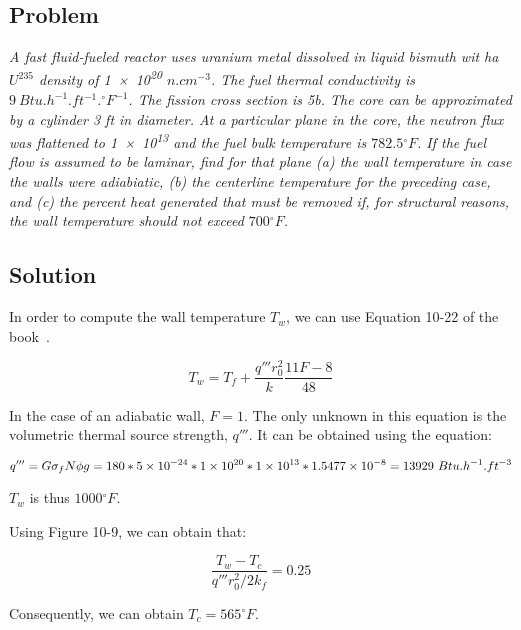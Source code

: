 \subsection{Problem}
\textit{A fast fluid-fueled reactor uses uranium metal dissolved in liquid bismuth wit ha $U^{235}$ density of \num{1e20} $n.cm^{-3}$. The fuel thermal conductivity is $9\ Btu.h^{-1}.ft^{-1}.{}^\circ F^{-1}$. The fission cross section is 5b. The core can be approximated by a cylinder 3 ft in diameter. At a particular plane in the core, the neutron flux was flattened to \num{1e13} and the fuel bulk temperature is $782.5{}^\circ F$. If the fuel flow is assumed to be laminar, find for that plane (a) the wall temperature in case the walls were adiabiatic, (b) the centerline temperature for the preceding case, and (c) the percent heat generated that must be removed if, for structural reasons, the wall temperature should not exceed $700{}^\circ F$.}

\subsection{Solution}


In order to compute the wall temperature $T_w$, we can use Equation 10-22 of the book~\cite{book01}.

\begin{equation}
T_w = T_f + \frac{q'''r_0^2}{k}\frac{11F-8}{48}
\end{equation}

In the case of an adiabatic wall, $F = 1$. The only unknown in this equation is the volumetric thermal source strength, $q'''$. It can be obtained using the equation:

\begin{equation}
q''' = G \sigma_f N \phi g = 180 * \text{\num{5e-24}} * \text{\num{1e20}} * \text{\num{1e13}} * \text{\num{1.5477e-8}} = 13929\ Btu.h^{-1}.ft^{-3}
\end{equation}

$T_w$ is thus $1000{}^\circ F$.

Using Figure 10-9, we can obtain that:

\begin{equation}
\frac{T_w - T_c}{q'''r_0^2/2k_f} = 0.25
\end{equation}

Consequently, we can obtain $T_c = 565{}^\circ F$.
